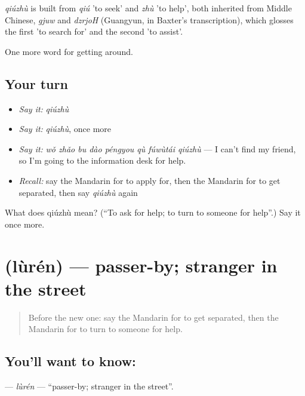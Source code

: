 \begin{cousinweb}
\emph{qiúzhù} is built from \emph{qiú} 'to seek' and \emph{zhù} 'to help', both inherited from Middle Chinese, \emph{gjuw} and \emph{dzrjoH} (Guangyun, in Baxter's transcription), which glosses the first 'to search for' and the second 'to assist'.
\end{cousinweb}

\begin{grammarlens}[title={What you've built}]
One more word for getting around.
\end{grammarlens}

\subsection*{Your turn}
\begin{itemize}
\raggedright
  \item \emph{Say it:} \emph{qiúzhù}
  \item \emph{Say it:} \emph{qiúzhù}, once more
  \item \emph{Say it:} \emph{wǒ zhǎo bu dào péngyou qù fúwùtái qiúzhù} — I can't find my friend, so I'm going to the information desk for help.
  \item \emph{Recall:} say the Mandarin for to apply for, then the Mandarin for to get separated, then say \emph{qiúzhù} again
\end{itemize}

\begin{tcolorbox}[breakable,colback=teal!4,colframe=teal!35!black,title={Before you move on}]
What does qiúzhù mean? (\textquotedblleft{}To ask for help; to turn to someone for help\textquotedblright{}.) Say it once more.
\end{tcolorbox}
\section[\texorpdfstring{\zh{路人} (lùrén)}{路人 (lùrén)}]{ (lùrén) — passer-by; stranger in the street}

\label{lesson:ZH-C456-luren}



\begin{quote}
Before the new one: say the Mandarin for to get separated, then the Mandarin for to turn to someone for help.
\end{quote}

\subsection*{You'll want to know: }
\textbf{} — \emph{lùrén} — \textquotedblleft{}passer-by; stranger in the street\textquotedblright{}.

